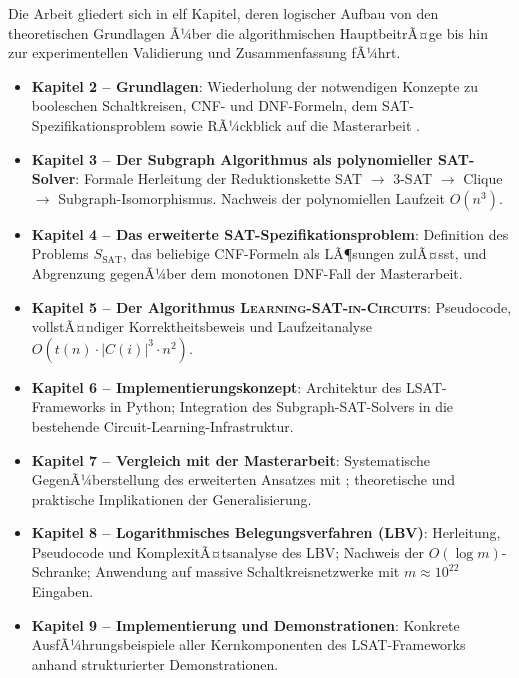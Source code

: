 ﻿\documentclass[a4paper,12pt]{article}
\theoremstyle{definition}
\begin{document}
Die Arbeit gliedert sich in elf Kapitel, deren logischer Aufbau von den theoretischen
Grundlagen Ã¼ber die algorithmischen HauptbeitrÃ¤ge bis hin zur experimentellen Validierung
und Zusammenfassung fÃ¼hrt.

\begin{itemize}
    \item[-] \textbf{Kapitel 2 -- Grundlagen}: Wiederholung der notwendigen Konzepte zu
      booleschen Schaltkreisen, CNF- und DNF-Formeln, dem SAT-Spezifikationsproblem sowie
      RÃ¼ckblick auf die Masterarbeit \cite{Epp13}.

    \item[-] \textbf{Kapitel 3 -- Der Subgraph Algorithmus als polynomieller SAT-Solver}:
      Formale Herleitung der Reduktionskette SAT $\to$ 3-SAT $\to$ Clique $\to$
      Subgraph-Isomorphismus.  Nachweis der polynomiellen Laufzeit $O(n^3)$.

    \item[-] \textbf{Kapitel 4 -- Das erweiterte SAT-Spezifikationsproblem}: Definition
      des Problems $S_{\text{SAT}}$, das beliebige CNF-Formeln als LÃ¶sungen zulÃ¤sst, und
      Abgrenzung gegenÃ¼ber dem monotonen DNF-Fall der Masterarbeit.

    \item[-] \textbf{Kapitel 5 -- Der Algorithmus \textsc{Learning-SAT-in-Circuits}}:
      Pseudocode, vollstÃ¤n\-diger Korrektheitsbeweis und Laufzeitanalyse
      $O(t(n) \cdot |C(i)|^3 \cdot n^2)$.

    \item[-] \textbf{Kapitel 6 -- Implementierungskonzept}: Architektur des LSAT-Frameworks
      in Python; Integration des Subgraph-SAT-Solvers in die bestehende
      Circuit-Learning-Infrastruktur.

    \item[-] \textbf{Kapitel 7 -- Vergleich mit der Masterarbeit}: Systematische
      GegenÃ¼berstellung des erweiterten Ansatzes mit \cite{Epp13}; theoretische und
      praktische Implikationen der Generalisierung.

    \item[-] \textbf{Kapitel 8 -- Logarithmisches Belegungsverfahren (LBV)}: Herleitung,
      Pseudocode und KomplexitÃ¤tsanalyse des LBV; Nachweis der $O(\log m)$-Schranke;
      Anwendung auf massive Schaltkreisnetzwerke mit $m \approx 10^{22}$ Eingaben.

    \item[-] \textbf{Kapitel 9 -- Implementierung und Demonstrationen}: Konkrete
      AusfÃ¼hrungsbei\-spiele aller Kernkomponenten des LSAT-Frameworks anhand
      strukturierter Demonstrationen.


\end{itemize}
\end{document}
